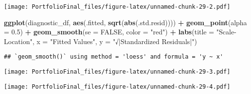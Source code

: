 \documentclass[
]{article}
\newenvironment{Shaded}{\begin{snugshade}}{\end{snugshade}}
\newcommand{\AttributeTok}[1]{\textcolor[rgb]{0.13,0.29,0.53}{#1}}
\newcommand{\ConstantTok}[1]{\textcolor[rgb]{0.56,0.35,0.01}{#1}}
\newcommand{\FloatTok}[1]{\textcolor[rgb]{0.00,0.00,0.81}{#1}}
\newcommand{\FunctionTok}[1]{\textcolor[rgb]{0.13,0.29,0.53}{\textbf{#1}}}
\newcommand{\NormalTok}[1]{#1}
\newcommand{\OtherTok}[1]{\textcolor[rgb]{0.56,0.35,0.01}{#1}}
\newcommand{\SpecialCharTok}[1]{\textcolor[rgb]{0.81,0.36,0.00}{\textbf{#1}}}
\newcommand{\StringTok}[1]{\textcolor[rgb]{0.31,0.60,0.02}{#1}}
\begin{document}
\texttt{[image: PortfolioFinal\_files/figure-latex/unnamed-chunk-29-2.pdf]}

\begin{Shaded}
\begin{Highlighting}[]
\FunctionTok{ggplot}\NormalTok{(diagnostic\_df, }\FunctionTok{aes}\NormalTok{(.fitted, }\FunctionTok{sqrt}\NormalTok{(}\FunctionTok{abs}\NormalTok{(.std.resid)))) }\SpecialCharTok{+}
  \FunctionTok{geom\_point}\NormalTok{(}\AttributeTok{alpha =} \FloatTok{0.5}\NormalTok{) }\SpecialCharTok{+}
  \FunctionTok{geom\_smooth}\NormalTok{(}\AttributeTok{se =} \ConstantTok{FALSE}\NormalTok{, }\AttributeTok{color =} \StringTok{"red"}\NormalTok{) }\SpecialCharTok{+}
  \FunctionTok{labs}\NormalTok{(}\AttributeTok{title =} \StringTok{"Scale{-}Location"}\NormalTok{, }\AttributeTok{x =} \StringTok{"Fitted Values"}\NormalTok{, }\AttributeTok{y =} \StringTok{"√|Standardized Residuals|"}\NormalTok{)}
\end{Highlighting}
\end{Shaded}

\begin{verbatim}
## `geom_smooth()` using method = 'loess' and formula = 'y ~ x'
\end{verbatim}

\texttt{[image: PortfolioFinal\_files/figure-latex/unnamed-chunk-29-3.pdf]}

\begin{Shaded}
\end{Shaded}

\texttt{[image: PortfolioFinal\_files/figure-latex/unnamed-chunk-29-4.pdf]}
\end{document}
